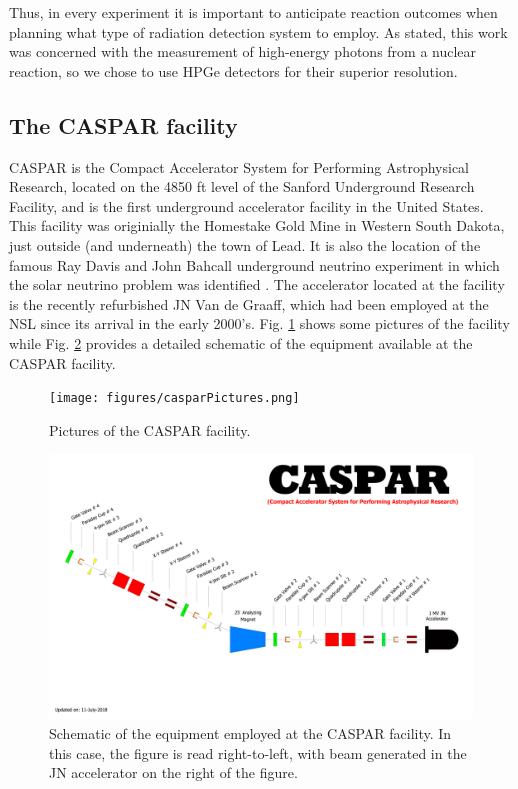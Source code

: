 Thus, in every experiment it is important to anticipate reaction outcomes when planning what type of radiation detection system to employ. As stated, this work was concerned with the measurement of high-energy photons from a nuclear reaction, so we chose to use HPGe detectors for their superior resolution.


\subsection{The CASPAR facility}
\label{sec: caspar}

CASPAR is the Compact Accelerator System for Performing Astrophysical Research, located on the 4850 ft level of the Sanford Underground Research Facility, and is the first underground accelerator facility in the United States. This facility was originially the Homestake Gold Mine in Western South Dakota, just outside (and underneath) the town of Lead. It is also the location of the famous Ray Davis and John Bahcall underground neutrino experiment in which the solar neutrino problem was identified \cite{Bahcall1976}. The accelerator located at the facility is the recently refurbished JN Van de Graaff, which had been employed at the NSL since its arrival in the early 2000's. Fig. \ref{fig: casparPictures} shows some pictures of the facility while Fig. \ref{fig: casparSchematic} provides a detailed schematic of the equipment available at the CASPAR facility. 


\begin{figure}
\centering
\texttt{[image: figures/casparPictures.png]}
\caption{Pictures of the CASPAR facility. }
\label{fig: casparPictures}
\end{figure}



\begin{figure}
\centering
\includegraphics[width=\linewidth]{figures/casparSchematic.pdf}
\caption{Schematic of the equipment employed at the CASPAR facility. In this case, the figure is read right-to-left, with beam generated in the JN accelerator on the right of the figure. }
\label{fig: casparSchematic}
\end{figure}



